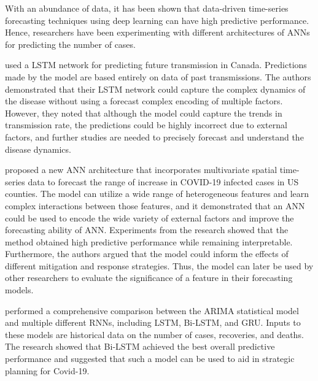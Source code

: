 With an abundance of data, it has been shown that data-driven time-series forecasting techniques using deep learning can have high predictive performance.
Hence, researchers have been experimenting with different architectures of \glspl{ANN} for predicting the number of cases.

\citeauthor{chimmulaTimeSeriesForecasting2020} \cite{chimmulaTimeSeriesForecasting2020} used a \gls{LSTM} network for predicting future transmission in Canada.
Predictions made by the model are based entirely on data of past transmissions.
The authors demonstrated that their \gls{LSTM} network could capture the complex dynamics of the disease without using a forecast complex encoding of multiple factors.
However, they noted that although the model could capture the trends in transmission rate, the predictions could be highly incorrect due to external factors, and further studies are needed to precisely forecast and understand the disease dynamics.

\citeauthor{ramchandaniDeepCOVIDNetInterpretableDeep2020} \cite{ramchandaniDeepCOVIDNetInterpretableDeep2020} proposed a new \gls{ANN} architecture that incorporates multivariate spatial time-series data to forecast the range of increase in COVID-19 infected cases in \gls{US} counties.
The model can utilize a wide range of heterogeneous features and learn complex interactions between those features, and it demonstrated that an \gls{ANN} could be used to encode the wide variety of external factors and improve the forecasting ability of \gls{ANN}.
Experiments from the research showed that the method obtained high predictive performance while remaining interpretable.
Furthermore, the authors argued that the model could inform the effects of different mitigation and response strategies.
Thus, the model can later be used by other researchers to evaluate the significance of a feature in their forecasting models.

\citeauthor{shahidPredictionsCOVID19Deep2020} \cite{shahidPredictionsCOVID19Deep2020} performed a comprehensive comparison between the \gls{ARIMA} statistical model and multiple different \glspl{RNN}, including \gls{LSTM}, \gls{Bi-LSTM}, and \gls{GRU}.
Inputs to these models are historical data on the number of cases, recoveries, and deaths.
The research showed that \gls{Bi-LSTM} achieved the best overall predictive performance and suggested that such a model can be used to aid in strategic planning for Covid-19.

